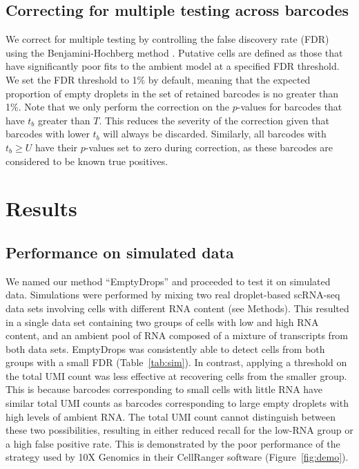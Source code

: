 \documentclass[10pt,letterpaper]{article}
\begin{document}
\subsection*{Correcting for multiple testing across barcodes}
We correct for multiple testing by controlling the false discovery rate (FDR) using the Benjamini-Hochberg method \cite{benjamini1995controlling}.
Putative cells are defined as those that have significantly poor fits to the ambient model at a specified FDR threshold.
We set the FDR threshold to 1\% by default, meaning that the expected proportion of empty droplets in the set of retained barcodes is no greater than 1\%.
Note that we only perform the correction on the $p$-values for barcodes that have $t_b$ greater than $T$.
This reduces the severity of the correction given that barcodes with lower $t_b$ will always be discarded.
Similarly, all barcodes with $t_b \ge U$ have their $p$-values set to zero during correction, as these barcodes are considered to be known true positives.

\section*{Results}

\subsection*{Performance on simulated data}
We named our method ``EmptyDrops'' and proceeded to test it on simulated data.
Simulations were performed by mixing two real droplet-based scRNA-seq data sets involving cells with different RNA content (see Methods).
This resulted in a single data set containing two groups of cells with low and high RNA content, and an ambient pool of RNA composed of a mixture of transcripts from both data sets.
EmptyDrops was consistently able to detect cells from both groups with a small FDR (Table~\ref{tab:sim}).
In contrast, applying a threshold on the total UMI count was less effective at recovering cells from the smaller group.
This is because barcodes corresponding to small cells with little RNA have similar total UMI counts as barcodes corresponding to large empty droplets with high levels of ambient RNA.
The total UMI count cannot distinguish between these two possibilities, resulting in either reduced recall for the low-RNA group or a high false positive rate.
This is demonstrated by the poor performance of the strategy used by 10X Genomics in their CellRanger software (Figure~\ref{fig:demo}).
\end{document}
